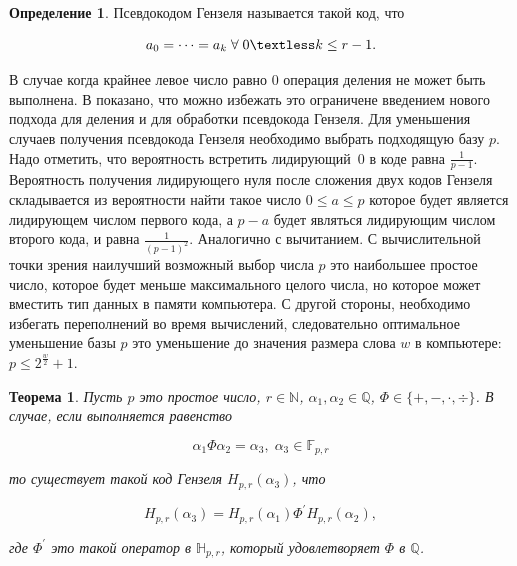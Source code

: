 \documentclass[master, och, diploma, times]{sty/SCWorks}
\theoremstyle{plain}
\newtheorem{thethm}{Теорема}[section]
\theoremstyle{definition}
\newtheorem{defn}{Определение}[section]
\begin{document}
\begin{defn}
Псевдокодом Гензеля называется такой код, что 

\begin{equation}
a_0=\dots=a_k \; \forall \; 0 \textless k \leq r-1.
\end{equation}

\end{defn}

В случае когда крайнее левое число равно $0$ операция деления не может быть выполнена. В \cite{bib:numbers:limongelli} показано, что можно избежать это ограничене \mbox{введением} нового подхода для деления и для обработки псевдокода \mbox{Гензеля}.
Для уменьшения случаев получения псевдокода Гензеля \mbox{необходимо} выбрать подходящую базу $p$. Надо отметить, что вероятность встретить \mbox{лидирующий $0$} в коде равна $\frac{1}{p-1}$. Вероятность получения лидирующего нуля после \mbox{сложения} двух кодов Гензеля складывается из вероятности найти такое число $0 \leq a \leq p$ которое будет является лидирующем числом первого кода, а $p-a$ будет являться лидирующим числом второго кода, и равна $\frac{1}{{(p-1)}^{2}}$. Аналогично с вычитанием. С вычислительной точки зрения наилучший возможный выбор числа $p$ это наибольшее простое число, которое будет меньше максимального целого числа, но которое может вместить  тип данных в памяти компьютера. С другой стороны, необходимо избегать переполнений во время вычислений, следовательно оптимальное уменьшение базы $p$ это уменьшение до значения размера слова $w$ в компьютере: $p \leq 2^\frac{w}{2}+1$.

\begin{thethm}\label{th:hensel}
Пусть $p$ это простое число, $r \in \mathbb{N}$, $\alpha_1, \alpha_2 \in \mathbb{Q}$, $\Phi \in \{+, -, \cdot , \div \}$. В случае, если выполняется равенство

\begin{equation}
\alpha_1\Phi \alpha_2 = \alpha_3, \; \alpha_3 \in \mathbb{F}_{p,r}
\end{equation}

\noindent то существует такой код Гензеля $H_{p,r}(\alpha_3)$, что

\begin{equation}
H_{p,r}(\alpha_3)=H_{p,r}(\alpha_1)\Phi^{'}H_{p,r}(\alpha_2),
\end{equation}

\noindent где $\Phi^{'}$ это такой оператор в $\mathbb{H}_{p,r}$, который удовлетворяет $\Phi$ в $\mathbb{Q}$.

\end{thethm}
\end{document}
